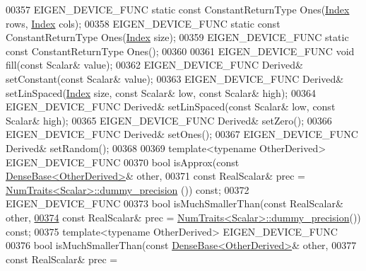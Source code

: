 \begin{DoxyCode}
00357     EIGEN\_DEVICE\_FUNC \textcolor{keyword}{static} \textcolor{keyword}{const} ConstantReturnType Ones(\hyperlink{namespace_eigen_a62e77e0933482dafde8fe197d9a2cfde}{Index} rows, 
      \hyperlink{namespace_eigen_a62e77e0933482dafde8fe197d9a2cfde}{Index} cols);
00358     EIGEN\_DEVICE\_FUNC \textcolor{keyword}{static} \textcolor{keyword}{const} ConstantReturnType Ones(\hyperlink{namespace_eigen_a62e77e0933482dafde8fe197d9a2cfde}{Index} size);
00359     EIGEN\_DEVICE\_FUNC \textcolor{keyword}{static} \textcolor{keyword}{const} ConstantReturnType Ones();
00360 
00361     EIGEN\_DEVICE\_FUNC \textcolor{keywordtype}{void} fill(\textcolor{keyword}{const} Scalar& value);
00362     EIGEN\_DEVICE\_FUNC Derived& setConstant(\textcolor{keyword}{const} Scalar& value);
00363     EIGEN\_DEVICE\_FUNC Derived& setLinSpaced(\hyperlink{namespace_eigen_a62e77e0933482dafde8fe197d9a2cfde}{Index} size, \textcolor{keyword}{const} Scalar& low, \textcolor{keyword}{const} Scalar& high);
00364     EIGEN\_DEVICE\_FUNC Derived& setLinSpaced(\textcolor{keyword}{const} Scalar& low, \textcolor{keyword}{const} Scalar& high);
00365     EIGEN\_DEVICE\_FUNC Derived& setZero();
00366     EIGEN\_DEVICE\_FUNC Derived& setOnes();
00367     EIGEN\_DEVICE\_FUNC Derived& setRandom();
00368 
00369     \textcolor{keyword}{template}<\textcolor{keyword}{typename} OtherDerived> EIGEN\_DEVICE\_FUNC
00370     \textcolor{keywordtype}{bool} isApprox(\textcolor{keyword}{const} \hyperlink{group___core___module_class_eigen_1_1_dense_base}{DenseBase<OtherDerived>}& other,
00371                   \textcolor{keyword}{const} RealScalar& prec = \hyperlink{group___core___module_struct_eigen_1_1_num_traits}{NumTraits<Scalar>::dummy\_precision}
      ()) \textcolor{keyword}{const};
00372     EIGEN\_DEVICE\_FUNC 
00373     \textcolor{keywordtype}{bool} isMuchSmallerThan(\textcolor{keyword}{const} RealScalar& other,
\hyperlink{group___core___module_a35eade54f5223ddb652c2057ab26b94c}{00374}                            \textcolor{keyword}{const} RealScalar& prec = 
      \hyperlink{group___core___module_struct_eigen_1_1_num_traits}{NumTraits<Scalar>::dummy\_precision}()) \textcolor{keyword}{const};
00375     \textcolor{keyword}{template}<\textcolor{keyword}{typename} OtherDerived> EIGEN\_DEVICE\_FUNC
00376     \textcolor{keywordtype}{bool} isMuchSmallerThan(\textcolor{keyword}{const} \hyperlink{group___core___module_class_eigen_1_1_dense_base}{DenseBase<OtherDerived>}& other,
00377                            \textcolor{keyword}{const} RealScalar& prec = 

\end{DoxyCode}
